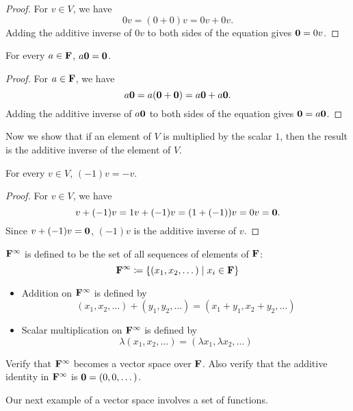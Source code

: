 \begin{proof}
For $v\in V$, we have
\[0v=(0+0)v=0v+0v.\]
Adding the additive inverse of $0v$ to both sides of the equation gives $\vb{0}=0v$.
\end{proof}

\begin{proposition}
For every $a\in\mathbf F$, $a\vb{0}=\vb{0}$.
\end{proposition}

\begin{proof}
For $a\in\mathbf F$, we have
\[a\vb{0}=a(\vb{0}+\vb{0})=a\vb{0}+a\vb{0}.\]
Adding the additive inverse of $a\vb{0}$ to both sides of the equation gives $\vb{0}=a\vb{0}$.
\end{proof}

Now we show that if an element of $V$ is multiplied by the scalar $1$, then the result is the additive inverse of the element of $V$.

\begin{proposition}
For every $v\in V$, $(-1)v=-v$.
\end{proposition}

\begin{proof}
For $v\in V$, we have
\[v+(-1)v=1v+(-1)v=(1+(-1))v=0v=\vb{0}.\]
Since $v+(-1)v=\vb{0}$, $(-1)v$ is the additive inverse of $v$.
\end{proof}

\begin{example}
$\mathbf F^\infty$ is defined to be the set of all sequences of elements of $\mathbf F$:
\[\mathbf F^\infty\coloneqq\{(x_1,x_2,\dots)\mid x_i\in\mathbf F\}\]
\begin{itemize}
\item Addition on $\mathbf F^\infty$ is defined by
\[(x_1,x_2,\dots)+(y_1,y_2,\dots)=(x_1+y_1,x_2+y_2,\dots)\]
\item Scalar multiplication on $\mathbf F^\infty$ is defined by
\[\lambda(x_1,x_2,\dots)=(\lambda x_1,\lambda x_2,\dots)\]
\end{itemize}

Verify that $\mathbf F^\infty$ becomes a vector space over $\mathbf F$. Also verify that the additive identity in $\mathbf F^\infty$ is $\vb{0}=(0,0,\dots)$.
\end{example}

Our next example of a vector space involves a set of functions.

